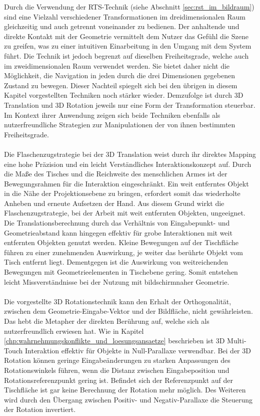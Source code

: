 Durch die Verwendung der RTS-Technik (siehe Abschnitt \ref{sec:rst_im_bildraum}) sind eine Vielzahl verschiedener Transformationen im dreidimensionalen Raum gleichzeitig und auch getrennt voneinander zu bedienen. Der anhaltende und direkte Kontakt mit der Geometrie vermittelt dem Nutzer das Gefühl die Szene zu greifen, was zu einer intuitiven Einarbeitung in den Umgang mit dem System führt. Die Technik ist jedoch begrenzt auf dieselben Freiheitsgrade, welche auch im zweidimensionalen Raum verwendet werden. Sie bietet daher nicht die Möglichkeit, die Navigation in jeden durch die drei Dimensionen gegebenen Zustand zu bewegen. Dieser Nachteil spiegelt sich bei den übrigen in diesem Kapitel vorgestellten Techniken noch stärker wieder. Demzufolge ist durch 3D Translation und 3D Rotation jeweils nur eine Form der Transformation steuerbar. Im Kontext ihrer Anwendung zeigen sich beide Techniken ebenfalls als nutzerfreundliche Strategien zur Manipulationen der von ihnen bestimmten Freiheitsgrade.
\\\\
Die Flaschenzugstrategie bei der 3D Translation weist durch ihr direktes Mapping eine hohe Präzision und ein leicht Verständliches Interaktionskonzept auf. Durch die Maße des Tisches und die Reichweite des menschlichen Armes ist der Bewegungsrahmen für die Interaktion eingeschränkt. Ein weit entferntes Objekt in die Nähe der Projektionsebene zu bringen, erfordert somit das wiederholte Anheben und erneute Aufsetzen der Hand. Aus diesem Grund wirkt die Flaschenzugstrategie, bei der Arbeit mit weit entfernten Objekten, ungeeignet. Die Translationsberechnung durch das Verhältnis von Eingabepunkt- und Geometrieabstand kann hingegen effektiv für grobe Interaktionen mit weit entfernten Objekten genutzt werden. Kleine Bewegungen auf der Tischfläche führen zu einer zunehmenden Auswirkung, je weiter das berührte Objekt vom Tisch entfernt liegt. Dementgegen ist die Auswirkung von weitreichenden Bewegungen mit Geometrieelementen in Tischebene gering. Somit entstehen leicht Missverständnisse bei der Nutzung mit bildschirmnaher Geometrie.
\\\\
Die vorgestellte 3D Rotationstechnik kann den Erhalt der Orthogonalität, zwischen dem Geometrie-Eingabe-Vektor und der Bildfläche, nicht gewährleisten. Das hebt die Metapher der direkten Berührung auf, welche sich als nutzerfreundlich erwiesen hat. Wie in Kapitel \ref{chp:wahrnehmungskonflikte_und_loesungsansaetze} beschrieben ist 3D Multi-Touch Interaktion effektiv für Objekte in Null-Parallaxe verwendbar. Bei der 3D Rotation können geringe Eingabeänderungen zu starken Anpassungen des Rotationswinkels führen, wenn die Distanz zwischen Eingabeposition und Rotationsreferenzpunkt gering ist. Befindet sich der Referenzpunkt auf der Tischfläche ist gar keine Berechnung der Rotation mehr möglich. Des Weiteren wird durch den Übergang zwischen Positiv- und Negativ-Parallaxe die Steuerung der Rotation invertiert.
